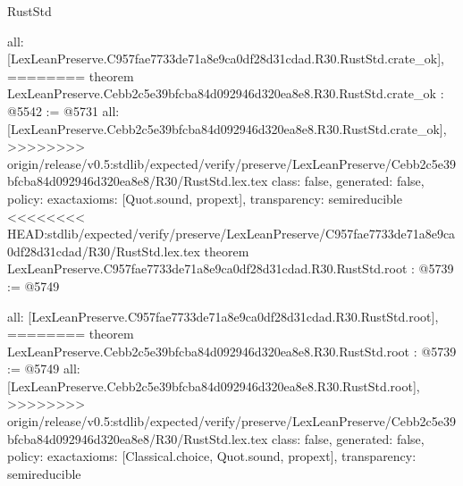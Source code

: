 \begin{lexlean}{RustStd}
\begin{coremodule}
{\begin{coremodule}
{{{{{{{{{{  all: [LexLeanPreserve.C957fae7733de71a8e9ca0df28d31cdad.R30.RustStd.crate_ok],
========
theorem LexLeanPreserve.Cebb2c5e39bfcba84d092946d320ea8e8.R30.RustStd.crate_ok : @5542 := @5731 {
  all: [LexLeanPreserve.Cebb2c5e39bfcba84d092946d320ea8e8.R30.RustStd.crate_ok],
>>>>>>>> origin/release/v0.5:stdlib/expected/verify/preserve/LexLeanPreserve/Cebb2c5e39bfcba84d092946d320ea8e8/R30/RustStd.lex.tex
  class: false,
  generated: false,
  policy: exact{axioms: [Quot.sound, propext]},
  transparency: semireducible
}
<<<<<<<< HEAD:stdlib/expected/verify/preserve/LexLeanPreserve/C957fae7733de71a8e9ca0df28d31cdad/R30/RustStd.lex.tex
theorem LexLeanPreserve.C957fae7733de71a8e9ca0df28d31cdad.R30.RustStd.root : @5739 := @5749 {
  all: [LexLeanPreserve.C957fae7733de71a8e9ca0df28d31cdad.R30.RustStd.root],
========
theorem LexLeanPreserve.Cebb2c5e39bfcba84d092946d320ea8e8.R30.RustStd.root : @5739 := @5749 {
  all: [LexLeanPreserve.Cebb2c5e39bfcba84d092946d320ea8e8.R30.RustStd.root],
>>>>>>>> origin/release/v0.5:stdlib/expected/verify/preserve/LexLeanPreserve/Cebb2c5e39bfcba84d092946d320ea8e8/R30/RustStd.lex.tex
  class: false,
  generated: false,
  policy: exact{axioms: [Classical.choice, Quot.sound, propext]},
  transparency: semireducible
}

}}}}}}}}}}}
\end{coremodule}}
\end{coremodule}
\end{lexlean}
